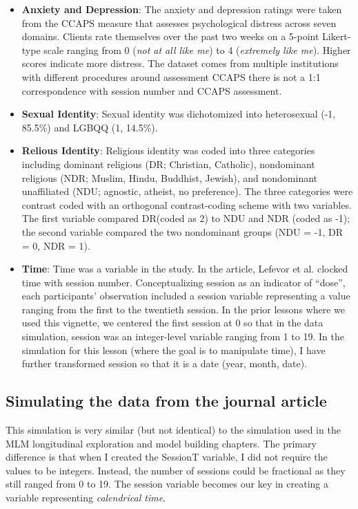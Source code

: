 \documentclass[
  english,
]{book}
\begin{document}
\begin{itemize}
\item
  \textbf{Anxiety and Depression}: The anxiety and depression ratings were taken from the CCAPS measure \citep{locke_development_2012} that assesses psychological distress across seven domains. Clients rate themselves over the past two weeks on a 5-point Likert-type scale ranging from 0 (\emph{not at all like me}) to 4 (\emph{extremely like me}). Higher scores indicate more distress. The dataset comes from multiple institutions with different procedures around assessment CCAPS there is not a 1:1 correspondence with session number and CCAPS assessment.
\item
  \textbf{Sexual Identity}: Sexual identity was dichotomized into heterosexual (-1, 85.5\%) and LGBQQ (1, 14.5\%).
\item
  \textbf{Relious Identity}: Religious identity was coded into three categories including dominant religious (DR; Christian, Catholic), nondominant religious (NDR; Muslim, Hindu, Buddhist, Jewish), and nondominant unaffiliated (NDU; agnostic, atheist, no preference). The three categories were contrast coded with an orthogonal contrast-coding scheme with two variables. The first variable compared DR(coded as 2) to NDU and NDR (coded as -1); the second variable compared the two nondominant groups (NDU = -1, DR = 0, NDR = 1).
\item
  \textbf{Time}: Time was a variable in the study. In the article, Lefevor et al. \citeyearpar{lefevor_religious_2017}clocked time with session number. Conceptualizing session as an indicator of ``dose'', each participants' observation included a session variable representing a value ranging from the first to the twentieth session. In the prior lessons where we used this vignette, we centered the first session at 0 so that in the data simulation, session was an integer-level variable ranging from 1 to 19. In the simulation for this lesson (where the goal is to manipulate time), I have further transformed session so that it is a date (year, month, date).
\end{itemize}

\hypertarget{simulating-the-data-from-the-journal-article-3}{%
\subsection{Simulating the data from the journal article}\label{simulating-the-data-from-the-journal-article-3}}

This simulation is very similar (but not identical) to the simulation used in the MLM longitudinal exploration and model building chapters. The primary difference is that when I created the SessionT variable, I did not require the values to be integers. Instead, the number of sessions could be fractional as they still ranged from 0 to 19. The session variable becomes our key in creating a variable representing \emph{calendrical time}.
\end{document}
